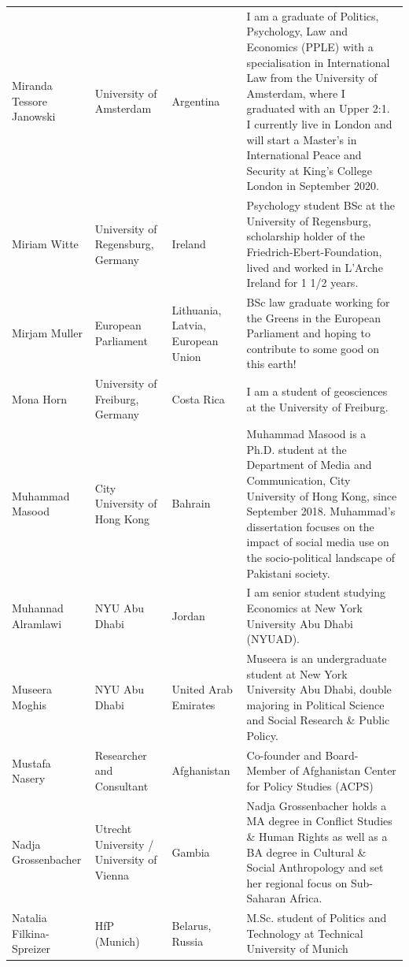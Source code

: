 \documentclass[]{article}
\begin{document}
\begin{longtable}{l>{\raggedright\arraybackslash}p{2cm}>{\raggedright\arraybackslash}p{2cm}>{\raggedright\arraybackslash}p{3cm}}
\addlinespace
Miranda Tessore Janowski & University of Amsterdam & Argentina & I am a graduate of Politics, Psychology, Law and Economics (PPLE) with a specialisation in International Law from the University of Amsterdam, where I graduated with an Upper 2:1. I currently live in London and will start a Master's in International Peace and Security at King's College London in September 2020.\\
\rowcolor{gray!6}  Miriam Witte & University of Regensburg, Germany & Ireland & Psychology student BSc at the University of Regensburg, scholarship holder of the Friedrich-Ebert-Foundation, lived and worked in L'Arche Ireland for 1 1/2 years.\\
Mirjam Muller & European Parliament & Lithuania, Latvia, European Union & BSc law graduate working for the Greens in the European Parliament and hoping to contribute to some good on this earth!\\
\rowcolor{gray!6}  Mona Horn & University of Freiburg, Germany & Costa Rica & I am a student of geosciences at the University of Freiburg.\\
Muhammad Masood & City University of Hong Kong & Bahrain & Muhammad Masood is a Ph.D. student at the Department of Media and Communication, City University of Hong Kong, since September 2018. Muhammad's dissertation focuses on the impact of social media use on the socio-political landscape of Pakistani society.\\
\addlinespace
\rowcolor{gray!6}  Muhannad Alramlawi & NYU Abu Dhabi & Jordan & I am senior student studying Economics at New York University Abu Dhabi (NYUAD).\\
Museera Moghis & NYU Abu Dhabi & United Arab Emirates & Museera is an undergraduate student at New York University Abu Dhabi, double majoring in Political Science and Social Research \& Public Policy.\\
\rowcolor{gray!6}  Mustafa Nasery & Researcher and Consultant & Afghanistan & Co-founder and Board-Member of Afghanistan Center for Policy Studies (ACPS)\\
Nadja Grossenbacher & Utrecht University / University of Vienna & Gambia & Nadja Grossenbacher holds a MA degree in Conflict Studies \& Human Rights as well as a BA degree in Cultural \& Social Anthropology and set her regional focus on Sub-Saharan Africa.\\
\rowcolor{gray!6}  Natalia Filkina-Spreizer & HfP (Munich) & Belarus, Russia & M.Sc. student of Politics and Technology at Technical University of Munich\\

\end{longtable}
\end{document}
